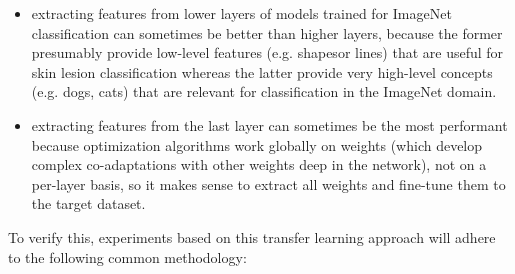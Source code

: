 \begin{itemize}
    \item extracting features from lower layers of models trained for ImageNet classification can sometimes be better than higher layers, because the former presumably provide low-level features (e.g. shapesor lines) that are useful for skin lesion classification whereas the latter provide very high-level concepts (e.g. dogs, cats) that are relevant for classification in the ImageNet domain.
    \item extracting features from the last layer can sometimes be the most performant because optimization algorithms work globally on weights (which develop complex co-adaptations with other weights deep in the network), not on a per-layer basis, so it makes sense to extract all weights and fine-tune them to the target dataset.
\end{itemize}

To verify this, experiments based on this transfer learning approach will adhere to the following common methodology:


